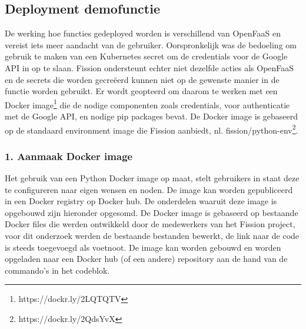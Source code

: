 \subsection{Deployment demofunctie}
De werking hoe functies gedeployed worden is verschillend van OpenFaaS en vereist iets meer aandacht van de gebruiker. Oorspronkelijk was de bedoeling om gebruik te maken van een Kubernetes secret om de credentials voor de Google API in op te slaan. Fission ondersteunt echter niet dezelfde acties als OpenFaaS en de secrets die worden gecreëerd kunnen niet op de gewenste manier in de functie worden gebruikt. Er wordt geopteerd om daarom te werken met een Docker image\footnote{https://dockr.ly/2LQTQTV} die de nodige componenten zoals credentials, voor authenticatie met de Google API, en nodige pip packages bevat. De Docker image is gebaseerd op de standaard environment image die Fission aanbiedt, nl. fission/python-env\footnote{https://dockr.ly/2QdsYvX}.

\subsubsection{1. Aanmaak Docker image}
Het gebruik van een Python Docker image op maat, stelt gebruikers in staat deze te configureren naar eigen wensen en noden. De image kan worden gepubliceerd in een Docker registry op Docker hub. De onderdelen waaruit deze image is opgebouwd zijn hieronder opgesomd. De Docker image is gebaseerd op bestaande Docker files die werden ontwikkeld door de medewerkers van het Fission project, voor dit onderzoek werden de bestaande bestanden bewerkt, de link naar de code is steeds toegevoegd als voetnoot. De image kan worden gebouwd en worden opgeladen naar een Docker hub (of een andere) repository aan de hand van de commando's in het codeblok.

